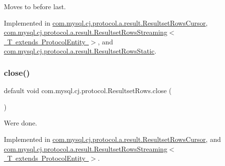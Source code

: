 Moves to before last. 

Implemented in \mbox{\hyperlink{classcom_1_1mysql_1_1cj_1_1protocol_1_1a_1_1result_1_1_resultset_rows_cursor_ad9ecb4a99d00c5fc3c2ada068b3d78e3}{com.\+mysql.\+cj.\+protocol.\+a.\+result.\+Resultset\+Rows\+Cursor}}, \mbox{\hyperlink{classcom_1_1mysql_1_1cj_1_1protocol_1_1a_1_1result_1_1_resultset_rows_streaming_a11ccbda4e0c40207c02253c5a2931748}{com.\+mysql.\+cj.\+protocol.\+a.\+result.\+Resultset\+Rows\+Streaming$<$ T extends Protocol\+Entity $>$}}, and \mbox{\hyperlink{classcom_1_1mysql_1_1cj_1_1protocol_1_1a_1_1result_1_1_resultset_rows_static_ae4eeeb6d930a55f44a5c80338115ef96}{com.\+mysql.\+cj.\+protocol.\+a.\+result.\+Resultset\+Rows\+Static}}.

\mbox{\label{interfacecom_1_1mysql_1_1cj_1_1protocol_1_1_resultset_rows_aae10da1813382e04a356d4e282d1a7f9}} 
\subsubsection{\texorpdfstring{close()}{close()}}
{\footnotesize\ttfamily default void com.\+mysql.\+cj.\+protocol.\+Resultset\+Rows.\+close (\begin{DoxyParamCaption}{ }\end{DoxyParamCaption})}

We\textquotesingle{}re done. 

Implemented in \mbox{\hyperlink{classcom_1_1mysql_1_1cj_1_1protocol_1_1a_1_1result_1_1_resultset_rows_cursor_a51a20849a2912a6869f24911f3334f76}{com.\+mysql.\+cj.\+protocol.\+a.\+result.\+Resultset\+Rows\+Cursor}}, and \mbox{\hyperlink{classcom_1_1mysql_1_1cj_1_1protocol_1_1a_1_1result_1_1_resultset_rows_streaming_ae16b87b06548b980f3b0e3d9df020296}{com.\+mysql.\+cj.\+protocol.\+a.\+result.\+Resultset\+Rows\+Streaming$<$ T extends Protocol\+Entity $>$}}.

\mbox{\label{interfacecom_1_1mysql_1_1cj_1_1protocol_1_1_resultset_rows_a495e468d6fb9aee61f47343ab45cdd52}} 
